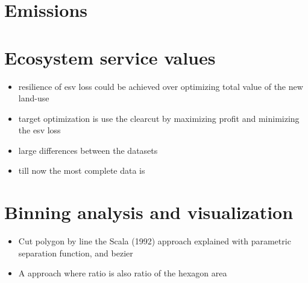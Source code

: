 	\section{Emissions}

	\section{Ecosystem service values}
		\begin{itemize}
			\item resilience of esv loss could be achieved over optimizing total value of the new land-use
			\item target optimization is use the clearcut by maximizing profit and minimizing the esv loss
			\item large differences between the datasets
			\item till now the most complete data is \citeauthor{Costanza2014}
		\end{itemize}

	\section{Binning analysis and visualization}
		\begin{itemize}
			\item Cut polygon by line the Scala (1992) approach explained with parametric separation function, and bezier
			\item A approach where ratio is also ratio of the hexagon area
		\end{itemize}

